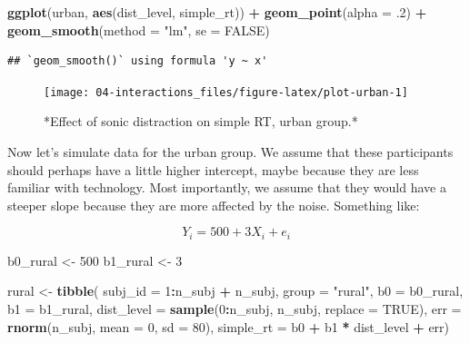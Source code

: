 \documentclass[]{book}
\newenvironment{Shaded}{\begin{snugshade}}{\end{snugshade}}
\newcommand{\DataTypeTok}[1]{\textcolor[rgb]{0.13,0.29,0.53}{#1}}
\newcommand{\DecValTok}[1]{\textcolor[rgb]{0.00,0.00,0.81}{#1}}
\newcommand{\FloatTok}[1]{\textcolor[rgb]{0.00,0.00,0.81}{#1}}
\newcommand{\KeywordTok}[1]{\textcolor[rgb]{0.13,0.29,0.53}{\textbf{#1}}}
\newcommand{\NormalTok}[1]{#1}
\newcommand{\OperatorTok}[1]{\textcolor[rgb]{0.81,0.36,0.00}{\textbf{#1}}}
\newcommand{\OtherTok}[1]{\textcolor[rgb]{0.56,0.35,0.01}{#1}}
\newcommand{\StringTok}[1]{\textcolor[rgb]{0.31,0.60,0.02}{#1}}
\begin{document}
\begin{Shaded}
\begin{Highlighting}[]
\KeywordTok{ggplot}\NormalTok{(urban, }\KeywordTok{aes}\NormalTok{(dist_level, simple_rt)) }\OperatorTok{+}\StringTok{ }
\StringTok{  }\KeywordTok{geom_point}\NormalTok{(}\DataTypeTok{alpha =} \FloatTok{.2}\NormalTok{) }\OperatorTok{+}
\StringTok{  }\KeywordTok{geom_smooth}\NormalTok{(}\DataTypeTok{method =} \StringTok{"lm"}\NormalTok{, }\DataTypeTok{se =} \OtherTok{FALSE}\NormalTok{)}
\end{Highlighting}
\end{Shaded}

\begin{verbatim}
## `geom_smooth()` using formula 'y ~ x'
\end{verbatim}

\begin{figure}

{\centering \texttt{[image: 04-interactions\_files/figure-latex/plot-urban-1]} 

}

\caption{*Effect of sonic distraction on simple RT, urban group.*}\label{fig:plot-urban}
\end{figure}

Now let's simulate data for the urban group. We assume that these participants should perhaps have a little higher intercept, maybe because they are less familiar with technology. Most importantly, we assume that they would have a steeper slope because they are more affected by the noise. Something like:

\[Y_i = 500 + 3 X_i + e_i\]

\begin{Shaded}
\begin{Highlighting}[]
\NormalTok{b0_rural <-}\StringTok{ }\DecValTok{500}
\NormalTok{b1_rural <-}\StringTok{ }\DecValTok{3}

\NormalTok{rural <-}\StringTok{ }\KeywordTok{tibble}\NormalTok{(}
  \DataTypeTok{subj_id =} \DecValTok{1}\OperatorTok{:}\NormalTok{n_subj }\OperatorTok{+}\StringTok{ }\NormalTok{n_subj,}
  \DataTypeTok{group =} \StringTok{"rural"}\NormalTok{,}
  \DataTypeTok{b0 =}\NormalTok{ b0_rural,}
  \DataTypeTok{b1 =}\NormalTok{ b1_rural,}
  \DataTypeTok{dist_level =} \KeywordTok{sample}\NormalTok{(}\DecValTok{0}\OperatorTok{:}\NormalTok{n_subj, n_subj, }\DataTypeTok{replace =} \OtherTok{TRUE}\NormalTok{),}
  \DataTypeTok{err =} \KeywordTok{rnorm}\NormalTok{(n_subj, }\DataTypeTok{mean =} \DecValTok{0}\NormalTok{, }\DataTypeTok{sd =} \DecValTok{80}\NormalTok{),}
  \DataTypeTok{simple_rt =}\NormalTok{ b0 }\OperatorTok{+}\StringTok{ }\NormalTok{b1 }\OperatorTok{*}\StringTok{ }\NormalTok{dist_level }\OperatorTok{+}\StringTok{ }\NormalTok{err)}
\end{Highlighting}
\end{Shaded}
\end{document}
